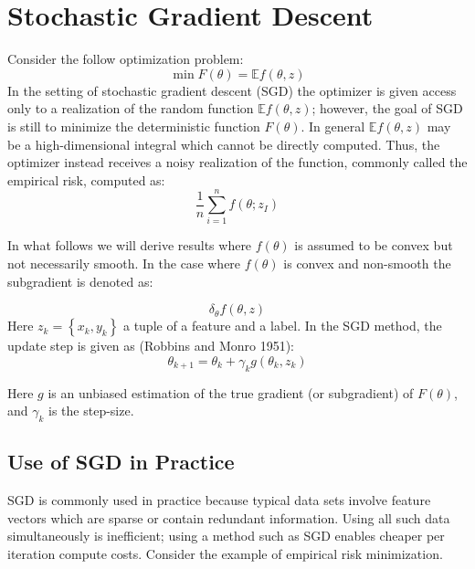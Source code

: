 \section{Stochastic Gradient Descent}
Consider the follow optimization problem:
\begin{equation*}
	\min F(\theta) = \mathbb{E}f(\theta, z)
\end{equation*}
In the setting of stochastic gradient descent (SGD) the optimizer is given access only to a realization of the random function $\mathbb{E} f (\theta, z)$; however, the goal of SGD is still to minimize the deterministic function $F(\theta)$. 
In general $\mathbb{E}f(\theta, z)$ may be a high-dimensional integral which cannot be directly computed. Thus, the optimizer instead receives a noisy realization of the function, commonly called the empirical risk, computed as:
\begin{equation*}
	\frac{1}{n}\sum_{i=1}^{n} f(\theta; z_I)
\end{equation*}

In what follows we will derive results where $f(\theta)$ is assumed to be convex but not necessarily smooth. In the case where $f(\theta)$ is convex and non-smooth the subgradient is denoted as: 

\begin{equation*}
	\delta_{\theta} f (\theta,z)
\end{equation*}
Here $z_k = \left\{x_k, y_k\right\}$ a tuple of a feature and a label. In the SGD method, the update step is given as (Robbins and Monro 1951): 
\begin{equation*}
	\theta_{k+1} = \theta_k + \gamma_k g\left(\theta_k, z_k\right)
\end{equation*}

Here $g$ is an unbiased estimation of the true gradient (or subgradient) of $F(\theta)$, and $\gamma_k$ is the step-size. 

\subsection{Use of SGD in Practice}
SGD is commonly used in practice because typical data sets involve feature vectors which are sparse or contain redundant information. Using all such data simultaneously is inefficient; using a method such as SGD enables cheaper per iteration compute costs. Consider the example of empirical risk minimization. 


